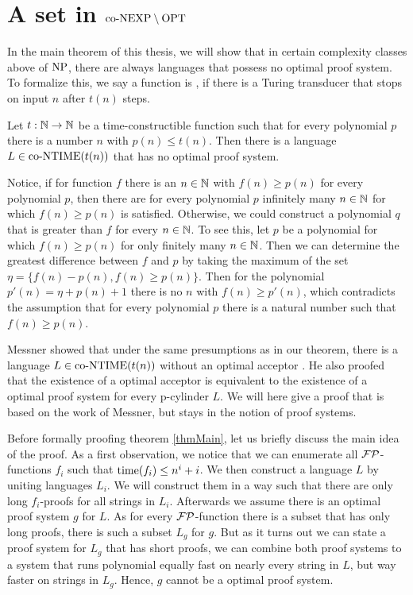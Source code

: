 \chapter{A set in $\text{co-NEXP} \setminus \text{OPT}$} \label{chpConexpMinusOpt}
  In the main theorem of this thesis, we will show that in certain complexity classes above of \(\text{NP}\), there are always languages that possess no optimal proof system. To formalize this, we say a function is , if there is a Turing transducer that stops on input \(n\) after \(t(n)\) steps.
  
  \begin{theorem}\label{thmMain}
    Let \(t : \mathbb{N} \to \mathbb{N}\) be a time-constructible function such that for every polynomial \(p\) there is a number \(n\) with \(p(n) \leq t(n)\). Then there is a language \(L \in \text{co-NTIME}(t(n))\) that has no optimal proof system.
  \end{theorem}

  Notice, if for function \(f\) there is an \(n \in \mathbb{N}\) with \(f(n) \geq p(n)\) for every polynomial \(p\), then there are for every polynomial \(p\) infinitely many \(n \in \mathbb{N}\) for which \(f(n) \geq p(n)\) is satisfied. Otherwise, we could construct a polynomial \(q\) that is greater than \(f\) for every \(n \in \mathbb{N}\). To see this, let \(p\) be a polynomial for which \(f(n) \geq p(n)\) for only finitely many \(n \in \mathbb{N}\). Then we can determine the greatest difference between \(f\) and \(p\) by taking the maximum of the set \(\eta = \{ f(n) - p(n), f(n) \geq p(n) \}\). Then for the polynomial \(p'(n) = \eta + p(n) + 1\) there is no \(n\) with \(f(n) \geq p'(n)\), which contradicts the assumption that for every polynomial \(p\) there is a natural number such that \(f(n) \geq p(n)\).

  Messner showed that under the same presumptions as in our theorem, there is a language \(L \in \text{co-NTIME}(t(n))\) without an optimal acceptor \cite{Mes99}. He also proofed that the existence of a optimal acceptor is equivalent to the existence of a optimal proof system for every p-cylinder \(L\). We will here give a proof that is based on the work of Messner, but stays in the notion of proof systems.

  Before formally proofing theorem \ref{thmMain}, let us briefly discuss the main idea of the proof. As a first observation, we notice that we can enumerate all \(\mathcal{FP}\)-functions \(f_i\) such that \(\operatorname{time}(f_i) \leq n^i + i\). We then construct a language \(L\) by uniting languages \(L_i\). We will construct them in a way such that there are only long \(f_i\)-proofs for all strings in \(L_i\). Afterwards we assume there is an optimal proof system \(g\) for \(L\). As for every \(\mathcal{FP}\)-function there is a subset that has only long proofs, there is such a subset \(L_g\) for \(g\). But as it turns out we can state a proof system for \(L_g\) that has short proofs, we can combine both proof systems to a system that runs polynomial equally fast on nearly every string in \(L\), but way faster on strings in \(L_g\). Hence, \(g\) cannot be a optimal proof system.
  
